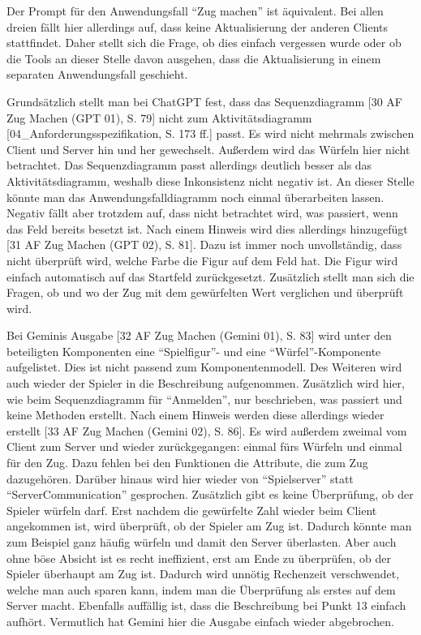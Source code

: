 Der Prompt für den Anwendungsfall ``Zug machen'' ist äquivalent. Bei allen dreien fällt hier allerdings auf, dass keine Aktualisierung 
der anderen Clients stattfindet. Daher stellt sich die Frage, ob dies einfach vergessen wurde oder ob die Tools an dieser Stelle davon 
ausgehen, dass die Aktualisierung in einem separaten Anwendungsfall geschieht.

Grundsätzlich stellt man bei ChatGPT fest, dass das Sequenzdiagramm [30 AF Zug Machen (GPT 01), S. 79] nicht zum Aktivitätsdiagramm [04\_Anforderungsspezifikation, S. 173 ff.] passt. Es wird nicht mehrmals 
zwischen Client und Server hin und her gewechselt. Außerdem wird das Würfeln hier nicht betrachtet. Das Sequenzdiagramm passt 
allerdings deutlich besser als das Aktivitätsdiagramm, weshalb diese Inkonsistenz nicht negativ ist. An dieser Stelle könnte man das 
Anwendungsfalldiagramm noch einmal überarbeiten lassen. Negativ fällt aber trotzdem auf, dass nicht betrachtet wird, was passiert, 
wenn das Feld bereits besetzt ist. Nach einem Hinweis wird dies allerdings hinzugefügt [31 AF Zug Machen (GPT 02), S. 81]. Dazu ist immer noch unvollständig, dass nicht 
überprüft wird, welche Farbe die Figur auf dem Feld hat. Die Figur wird einfach automatisch auf das Startfeld zurückgesetzt. 
Zusätzlich stellt man sich die Fragen, ob und wo der Zug mit dem gewürfelten Wert verglichen und überprüft wird. 

Bei Geminis Ausgabe [32 AF Zug Machen (Gemini 01), S. 83] wird unter den beteiligten Komponenten eine ``Spielfigur''- und eine ``Würfel''-Komponente aufgelistet. Dies ist nicht 
passend zum Komponentenmodell. Des Weiteren wird auch wieder der Spieler in die Beschreibung aufgenommen. Zusätzlich wird hier, 
wie beim Sequenzdiagramm für ``Anmelden'', nur beschrieben, was passiert und keine Methoden erstellt. Nach einem Hinweis werden diese 
allerdings wieder erstellt [33 AF Zug Machen (Gemini 02), S. 86]. Es wird außerdem zweimal vom Client zum Server und wieder zurückgegangen: einmal fürs Würfeln und einmal 
für den Zug. Dazu fehlen bei den Funktionen die Attribute, die zum Zug dazugehören. Darüber hinaus wird hier wieder von ``Spielserver'' 
statt ``ServerCommunication'' gesprochen. Zusätzlich gibt es keine Überprüfung, ob der Spieler würfeln darf. Erst nachdem die gewürfelte 
Zahl wieder beim Client angekommen ist, wird überprüft, ob der Spieler am Zug ist. Dadurch könnte man zum Beispiel ganz häufig würfeln 
und damit den Server überlasten. Aber auch ohne böse Absicht ist es recht ineffizient, erst am Ende zu überprüfen, ob der Spieler 
überhaupt am Zug ist. Dadurch wird unnötig Rechenzeit verschwendet, welche man auch sparen kann, indem man die Überprüfung als erstes 
auf dem Server macht. Ebenfalls auffällig ist, dass die Beschreibung bei Punkt 13 einfach aufhört. Vermutlich hat Gemini hier die 
Ausgabe einfach wieder abgebrochen.

